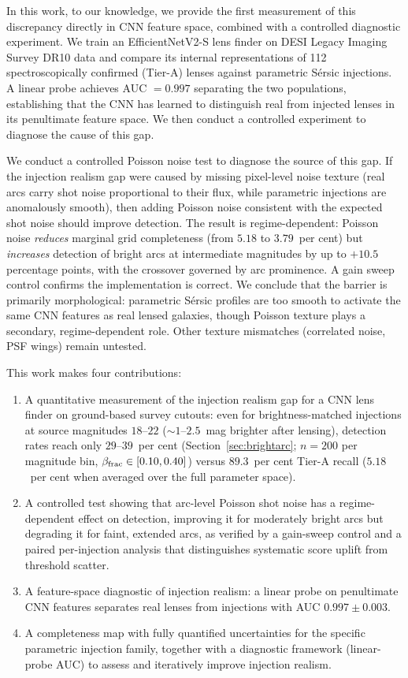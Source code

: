 \documentclass[fleqn,usenatbib]{rasti}
\begin{document}
In this work, to our knowledge, we provide the first measurement of this discrepancy directly in CNN feature space, combined with a controlled diagnostic experiment.  We train an EfficientNetV2-S lens finder on DESI Legacy Imaging Survey DR10 data and compare its internal representations of 112 spectroscopically confirmed (Tier-A) lenses against parametric S\'{e}rsic injections.  A linear probe achieves AUC $= 0.997$ separating the two populations, establishing that the CNN has learned to distinguish real from injected lenses in its penultimate feature space.  We then conduct a controlled experiment to diagnose the cause of this gap.

We conduct a controlled Poisson noise test to diagnose the source of this gap.  If the injection realism gap were caused by missing pixel-level noise texture (real arcs carry shot noise proportional to their flux, while parametric injections are anomalously smooth), then adding Poisson noise consistent with the expected shot noise should improve detection.  The result is regime-dependent: Poisson noise \emph{reduces} marginal grid completeness (from $5.18$ to $3.79$~per cent) but \emph{increases} detection of bright arcs at intermediate magnitudes by up to $+10.5$ percentage points, with the crossover governed by arc prominence.  A gain sweep control confirms the implementation is correct.  We conclude that the barrier is primarily morphological: parametric S\'{e}rsic profiles are too smooth to activate the same CNN features as real lensed galaxies, though Poisson texture plays a secondary, regime-dependent role.  Other texture mismatches (correlated noise, PSF wings) remain untested.

This work makes four contributions:
\begin{enumerate}
\item A quantitative measurement of the injection realism gap for a CNN lens finder on ground-based survey cutouts: even for brightness-matched injections at source magnitudes $18$--$22$ ($\sim\!1$--$2.5$~mag brighter after lensing), detection rates reach only $29$--$39$~per cent (Section~\ref{sec:brightarc}; $n = 200$ per magnitude bin, $\beta_{\rm frac} \in [0.10, 0.40]$) versus $89.3$~per cent Tier-A recall ($5.18$~per cent when averaged over the full parameter space).
\item A controlled test showing that arc-level Poisson shot noise has a regime-dependent effect on detection, improving it for moderately bright arcs but degrading it for faint, extended arcs, as verified by a gain-sweep control and a paired per-injection analysis that distinguishes systematic score uplift from threshold scatter.
\item A feature-space diagnostic of injection realism: a linear probe on penultimate CNN features separates real lenses from injections with AUC $0.997 \pm 0.003$.
\item A completeness map with fully quantified uncertainties for the specific parametric injection family, together with a diagnostic framework (linear-probe AUC) to assess and iteratively improve injection realism.
\end{enumerate}
\end{document}
